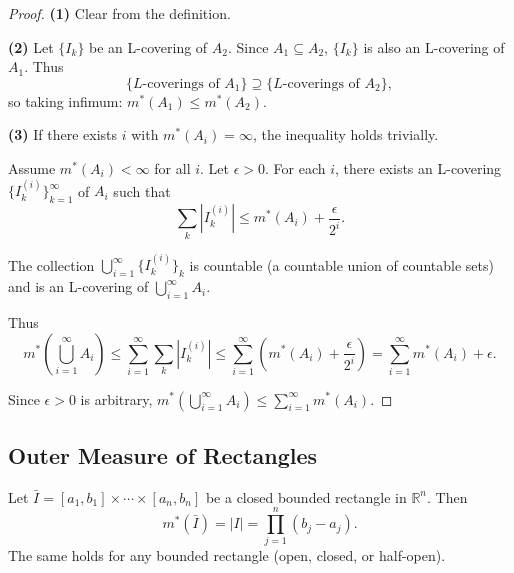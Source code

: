 \documentclass[11pt]{report}
\begin{document}
\begin{proof}
\textbf{(1)} Clear from the definition.

\textbf{(2)} Let $\{I_k\}$ be an L-covering of $A_2$. Since $A_1 \subseteq A_2$, $\{I_k\}$ is also an L-covering of $A_1$. Thus
\[
\{L\text{-coverings of } A_1\} \supseteq \{L\text{-coverings of } A_2\},
\]
so taking infimum: $m^*(A_1) \leq m^*(A_2)$.

\textbf{(3)} If there exists $i$ with $m^*(A_i) = \infty$, the inequality holds trivially.

Assume $m^*(A_i) < \infty$ for all $i$. Let $\epsilon > 0$. For each $i$, there exists an L-covering $\{I_k^{(i)}\}_{k=1}^{\infty}$ of $A_i$ such that
\[
\sum_k |I_k^{(i)}| \leq m^*(A_i) + \frac{\epsilon}{2^i}.
\]

The collection $\bigcup_{i=1}^{\infty} \{I_k^{(i)}\}_k$ is countable (a countable union of countable sets) and is an L-covering of $\bigcup_{i=1}^{\infty} A_i$.

Thus
\[
m^*\left( \bigcup_{i=1}^{\infty} A_i \right) \leq \sum_{i=1}^{\infty} \sum_k |I_k^{(i)}| \leq \sum_{i=1}^{\infty} \left( m^*(A_i) + \frac{\epsilon}{2^i} \right) = \sum_{i=1}^{\infty} m^*(A_i) + \epsilon.
\]

Since $\epsilon > 0$ is arbitrary, $m^*\left( \bigcup_{i=1}^{\infty} A_i \right) \leq \sum_{i=1}^{\infty} m^*(A_i)$.
\end{proof}

\subsection{Outer Measure of Rectangles}

\begin{propbox}
Let $\bar{I} = [a_1, b_1] \times \cdots \times [a_n, b_n]$ be a closed bounded rectangle in $\mathbb{R}^n$. Then
\[
m^*(\bar{I}) = |I| = \prod_{j=1}^{n} (b_j - a_j).
\]
The same holds for any bounded rectangle (open, closed, or half-open).
\end{propbox}
\end{document}
